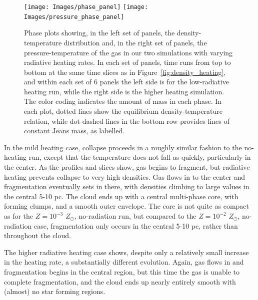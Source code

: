 \documentclass[useAMS,usenatbib]{mn2e}
\begin{document}
\begin{figure}
\begin{center}
\hspace{-0.4cm}
\texttt{[image: Images/phase\_panel]} \hspace{-1cm}
\texttt{[image: Images/pressure\_phase\_panel]} \hspace{-1.5cm}
\end{center}
\caption{\label{fig:phase_panels} Phase plots showing, in the left set of panels, the density-temperature distribution and, in the right set of panels, the pressure-temperature of the gas in our two simulations with varying radiative heating rates.   In each set of panels, time runs from top to bottom at the same time slices as in Figure~\ref{fig:density_heating}, and within each set of 6 panels the left side is for the low-radiative heating run, while the right side is the higher heating simulation.  The color coding indicates the amount of mass in each phase.   In each plot, dotted lines show the equilibrium density-temperature relation, while dot-dashed lines in the bottom row provides lines of constant Jeans mass, as labelled.}
\end{figure}

In the mild heating case, collapse proceeds in a roughly similar fashion to the no-heating run, except that the temperature does not fall as quickly,
particularly in the center. As the profiles and slices show, gas begins to fragment, but radiative heating prevents collapse to very high densities.
Gas flows in to the center and fragmentation eventually sets in there, with densities climbing to large values in the central 5-10 pc. The cloud
ends up with a central multi-phase core, with forming clumps, and a smooth outer envelope. The core is not quite as compact as for the
$Z=10^{-3}$ $Z_\odot$, no-radiation run, but compared to the $Z=10^{-2}$ $Z_\odot$, no-radiation case, fragmentation only occurs in the central 5-10 pc, rather than throughout the cloud.

The higher radiative heating case shows, despite only a relatively small increase in the heating rate, a substantially different evolution. Again,
gas flows in and fragmentation begins in the central region, but this time the gas is unable to complete fragmentation, and the cloud ends up nearly
entirely smooth with (almost) no star forming regions.
\end{document}
